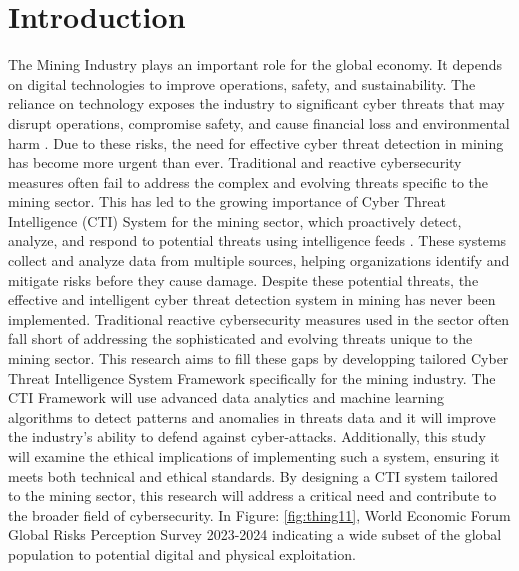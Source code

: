 \documentclass[a4paper,twoside,12pt]{report}
\begin{document}
{}
\tableofcontents
\newpage
{}
{}
\listoffigures
\newpage
{}
{}
\listoftables
\newpage
{}
\chapter{Introduction}
The Mining Industry plays an important role for the global economy. It depends on digital technologies to improve operations, safety, and sustainability. The reliance on technology exposes the industry to significant cyber threats that may disrupt operations, compromise safety, and cause financial loss and environmental harm \citet{lenka2023cybersecurity}. Due to these risks, the need for effective cyber threat detection in mining has become more urgent than ever. Traditional and reactive cybersecurity measures often fail to address the complex and evolving threats \citet{liu2022tricti} specific to the mining sector. This has led to the growing importance of Cyber Threat Intelligence (CTI) System for the mining sector, which proactively detect, analyze, and respond to potential threats using intelligence feeds \citet{webb2014information}. These systems collect and analyze data from multiple sources, helping organizations identify and mitigate risks before they cause damage. Despite these potential threats, the effective and intelligent cyber threat detection system in mining has never been implemented. Traditional reactive cybersecurity measures used in the sector often fall short of addressing the sophisticated and evolving threats unique to the mining sector. This research aims to fill these gaps by developping tailored Cyber Threat Intelligence System Framework specifically for the mining industry. The CTI Framework will use advanced data analytics and machine learning algorithms to detect patterns and anomalies in threats data and it will improve the industry’s ability to defend against cyber-attacks. Additionally, this study will examine the ethical implications of implementing such a system, ensuring it meets both technical and ethical standards. By designing a CTI system tailored to the mining sector, this research will address a critical need and contribute to the broader field of cybersecurity. In Figure: \ref{fig:thing11}, World Economic Forum Global Risks Perception Survey 2023-2024 indicating a wide subset of the global population to potential digital and physical exploitation.
\end{document}
